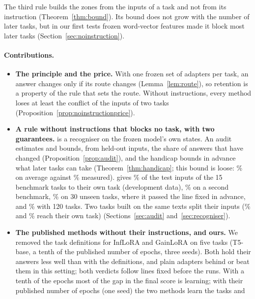 The third rule builds the zones from the inputs of a task and not from its instruction
(Theorem~\ref{thm:bound}). Its bound does not grow with the number of later tasks, but in our first
tests frozen word-vector features made it block most later tasks
(Section~\ref{sec:noinstruction}).

\paragraph{Contributions.}
\begin{itemize}
  \item \textbf{The principle and the price.} With one frozen set of adapters per task, an answer
  changes only if its route changes (Lemma~\ref{lem:route}), so retention is a property of the rule
  that sets the route. Without instructions, every method loses at least the conflict of the inputs
  of two tasks (Proposition~\ref{prop:noinstructionprice}).
  \item \textbf{A rule without instructions that blocks no task, with two guarantees.} \recog{} is
  a recogniser on the frozen model's own states. An audit estimates and bounds, from held-out
  inputs, the share of answers that have changed (Proposition~\ref{prop:audit}), and the handicap
  bounds in advance what later tasks can take (Theorem~\ref{thm:handicap}; this bound is loose:
  \AudDevHPrimeTTwoBound{}\% on average against \AudDevHPrimeTTwoChanged{}\% measured). \recog{}
  gives \AudDevLLamOneEnd{}\% of the test inputs of the 15 benchmark tasks to their own task
  (development data), \AudScaleLongThreeEnd{}\% on a second benchmark, \AudFreshFourthLEnd{}\% on 30
  unseen tasks, where it passed the line fixed in advance, and \AudScaleAllHundredTwentyEnd{}\% with
  120 tasks. Two tasks built on the same texts split their inputs (\AudScalePairOlderLEnd{}\% and
  \AudScalePairNewerLEnd{}\% reach their own task)
  (Sections~\ref{sec:audit} and~\ref{sec:recogniser}).
  \item \textbf{The published methods without their instructions, and ours.} We removed the task
  definitions for InfLoRA and GainLoRA on five tasks (T5-base, a tenth of the published number of
  epochs, three seeds). Both hold their answers less well than with the definitions, and plain
  adapters behind \recog{} or \handicap{} beat them in this setting; both verdicts follow lines
  fixed before the runs. With a tenth of the epochs most of the gap in the final score is
  learning; with their published number of epochs (one seed) the two methods learn the tasks and

\end{itemize}
